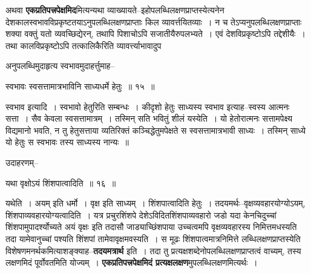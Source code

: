 \documentclass[article,12pt,a4paper]{memoir}
\begin{document}
	  \pstart अथवा \textbf{एकप्रतिपत्त्रपेक्षमिद}मित्यन्यथा व्याख्यायते--इहोपलब्धिलक्षणप्राप्तस्येत्यनेन देशकालस्वभावविप्रकृष्टतयाऽनुपलब्धिलक्षणप्राप्ताः किल व्यावर्त्तयितव्याः । न च तेऽप्यनुपलब्धिलक्षणप्राप्ताः शक्या वक्तुं यतो व्यवच्छिद्येरन्, तथापि पिशाचोऽपि सजातीयैरुपलभ्यते । एवं देशविप्रकृष्टोऽपि तद्देशीयैः । तथा कालविप्रकृष्टोऽपि तत्कालिकैरिति व्यावर्त्त्याभावादुप \leavevmode{} 
	  
	अनुपलब्धिमुदाहृत्य स्वभावमुदाहर्त्तुमाह--  
	  
	स्वभावः स्वसत्तामात्रभाविनि साध्यधर्मे हेतुः ॥ १५ ॥ 
	  
	स्वभाव इत्यादि । स्वभावो हेतुरिति सम्बन्धः । कीदृशो हेतुः साध्यस्य स्वभाव इत्याह--स्वस्य आत्मनः सत्ता । सैव केवला स्वसत्तामात्रम् । तस्मिन् सति भवितुं शीलं यस्येति । यो हेतोरात्मनः सत्तामपेक्ष्य विद्यमानो भवति, न तु हेतुसत्ताया व्यतिरिक्तं कञ्चिद्धेतुमपेक्षते स स्वसत्तामात्रभावी साध्यः । तस्मिन् साध्ये यो हेतुः स स्वभावः तस्य साध्यस्य नान्यः ॥  
	  
	उदाहरणम्--  
	  
	यथा वृक्षोऽयं शिंशपात्वादिति ॥ १६ ॥ 
	  
	यथेति । अयम् इति धर्मो । वृक्ष इति साध्यम् । शिंशपात्वादिति हेतुः । तदयमर्थः--वृक्षव्यवहारयोग्योऽयम्, शिंशपाव्यवहारयोग्यत्वादिति । यत्र प्रचुरशिंशपे देशेऽविदितशिंशपाव्यवहारो जडो यदा केनचिदुच्चां शिंशपामुपादर्श्योच्यते अयं वृक्षः इति तदासौ जाड्याच्छिंशपाया उच्चत्वमपि वृक्षव्यवहारस्य निमित्तमधस्यति तदा यामेवानुच्चां पश्यति शिंशपां तामेवावृक्षमवस्यति । स मूढः शिंशपात्वमात्रनिमित्ते लब्धिलक्षणप्राप्तस्येति विशेषणमनर्थकमित्याशङ्क्याह--\textbf{तदयमत्रार्थ} इति । तदा तु प्रत्यक्षशब्देनोपलब्धिलक्षणप्राप्तत्वं वाच्यम्, तस्य लक्षणमिदं पूर्वोवतमिति योज्यम् । \textbf{एकप्रतिपत्त्रपेक्षमिदं प्रत्यक्षलक्षण}मुपलब्धिलक्षणमित्यर्थः ।
	\pend
      
\end{document}
